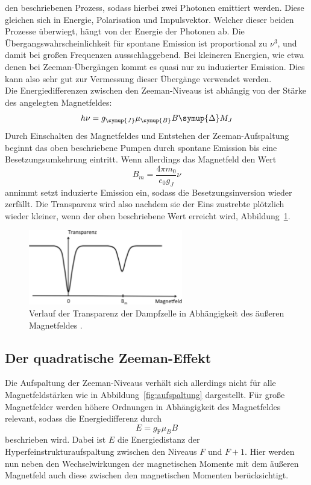 \documentclass[
  bibliography=totoc,     %
  captions=tableheading,  %
  titlepage=firstiscover, %
]{scrartcl}
\begin{document}
den beschriebenen Prozess, sodass hierbei zwei Photonen emittiert werden. Diese
gleichen sich in Energie, Polarisation und Impulsvektor. Welcher dieser beiden
Prozesse überwiegt, hängt von der Energie der Photonen ab. Die
Übergangswahrscheinlichkeit für spontane Emission ist proportional zu $\nu^3$,
und damit bei großen Frequenzen aussschlaggebend. Bei kleineren Energien, wie
etwa denen bei Zeeman-Übergängen kommt es quasi nur zu induzierter Emission.
Dies kann also sehr gut zur Vermessung dieser Übergänge verwendet werden. \\
Die Energiedifferenzen zwischen den Zeeman-Niveaus ist abhängig von der Stärke
des angelegten Magnetfeldes:
%
\begin{equation}
  h\nu=g_{\symup{J}}\mu_{\symup{B}}B\symup{\Delta}M_J
  \label{eq:übergangsenergie}
\end{equation}
%
Durch Einschalten des Magnetfeldes und Entstehen der Zeeman-Aufspaltung beginnt
das oben beschriebene Pumpen durch spontane Emission bis eine
Besetzungsumkehrung eintritt. Wenn allerdings das Magnetfeld den Wert
%
\begin{equation}
  B_m=\frac{4\pi m_0}{e_0g_J}\nu
\end{equation}
%
annimmt setzt induzierte Emission ein, sodass die Besetzungsinversion wieder
zerfällt. Die Transparenz wird also nachdem sie der Eins zustrebte plötzlich
wieder kleiner, wenn der oben beschriebene Wert erreicht wird, Abbildung~\ref{fig:transparenz_b}.
%
\begin{figure}[htb]
  \centering
  \includegraphics[width=0.6\textwidth]{transparenzkurve.pdf}
  \caption{Verlauf der Transparenz der Dampfzelle in Abhängigkeit des äußeren Magnetfeldes \cite{anleitung}.}
  \label{fig:transparenz_b}
\end{figure}
%


\subsection{Der quadratische Zeeman-Effekt}

Die Aufspaltung der Zeeman-Niveaus verhält sich allerdings nicht für alle Magnetfeldstärken wie in Abbildung~\ref{fig:aufspaltung} dargestellt. Für große Magnetfelder werden höhere Ordnungen in Abhängigkeit des Magnetfeldes relevant, sodass die Energiedifferenz durch
%
\begin{equation}
  E = g_{\mathup{F}}\mu_{B}B
  \label{eq:quad_zeeman}
\end{equation}
%
beschrieben wird. Dabei ist $E$ die Energiedistanz der
Hyperfeinstrukturaufspaltung zwischen den Niveaus $F$ und $F+1$. Hier werden nun
neben den Wechselwirkungen der magnetischen Momente mit dem äußeren Magnetfeld
auch diese zwischen den magnetischen Momenten berücksichtigt.
\end{document}
